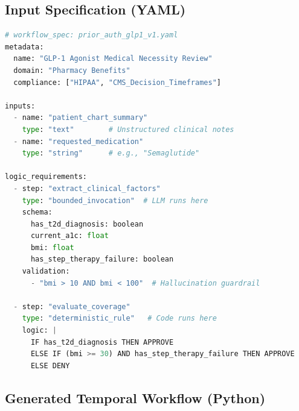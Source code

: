 \documentclass[11pt]{article}
\begin{document}
\subsection{Input Specification (YAML)}

\begin{lstlisting}[language=Python, caption={Workflow specification for GLP-1 medication prior authorization}, basicstyle=\small\ttfamily]
# workflow_spec: prior_auth_glp1_v1.yaml
metadata:
  name: "GLP-1 Agonist Medical Necessity Review"
  domain: "Pharmacy Benefits"
  compliance: ["HIPAA", "CMS_Decision_Timeframes"]

inputs:
  - name: "patient_chart_summary"
    type: "text"        # Unstructured clinical notes
  - name: "requested_medication"
    type: "string"      # e.g., "Semaglutide"

logic_requirements:
  - step: "extract_clinical_factors"
    type: "bounded_invocation"  # LLM runs here
    schema:
      has_t2d_diagnosis: boolean
      current_a1c: float
      bmi: float
      has_step_therapy_failure: boolean
    validation:
      - "bmi > 10 AND bmi < 100"  # Hallucination guardrail

  - step: "evaluate_coverage"
    type: "deterministic_rule"   # Code runs here
    logic: |
      IF has_t2d_diagnosis THEN APPROVE
      ELSE IF (bmi >= 30) AND has_step_therapy_failure THEN APPROVE
      ELSE DENY
\end{lstlisting}

\subsection{Generated Temporal Workflow (Python)}
\end{document}
